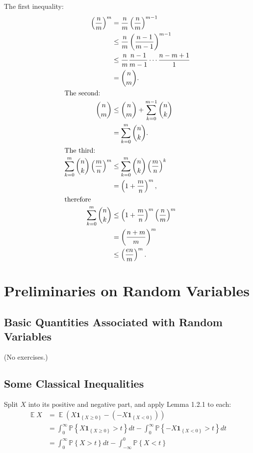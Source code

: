 \documentclass{report}
\theoremstyle{definition}
\newenvironment{exercise}[1]{
  \renewcommand\theexerciseimpl{#1}
  \exerciseimpl
}{\endexerciseimpl}
\DeclareMathOperator{\E}{\mathbb{E}}
\renewcommand{\P}[1]{\mathbb{P}\left\{#1\right\}}
\newcommand{\ind}[1]{\mathbf{1}_{\left\{#1\right\}}}
\begin{document}
\begin{exercise}{0.0.5}
  The first inequality:
  \begin{align*}
    \left(\frac{n}{m}\right)^m & = \frac{n}{m} \left(\frac{n}{m}\right)^{m-1} \\
    & \le \frac{n}{m} \left(\frac{n-1}{m-1}\right)^{m-1} \\
    & \le \frac{n}{m} \frac{n-1}{m-1} \cdots \frac{n-m+1}{1} \\
    & = \binom{n}{m}. \\
    \intertext{The second:}
    \binom{n}{m} & \le \binom{n}{m} + \sum_{k=0}^{m-1} \binom{n}{k} \\
    & = \sum_{k=0}^m \binom{n}{k}. \\
    \intertext{The third:}
    \sum_{k=0}^m \binom{n}{k} \left(\frac{m}{n}\right)^m & \le \sum_{k=0}^m \binom{n}{k} \left(\frac{m}{n}\right)^k \\
    & = \left(1 + \frac{m}{n}\right)^m, \\
    \intertext{therefore}
    \sum_{k=0}^m \binom{n}{k} & \le \left(1 + \frac{m}{n}\right)^m \left(\frac{n}{m}\right)^m \\
    & = \left(\frac{n + m}{m}\right)^m \\
    & \le \left(\frac{e n}{m}\right)^m.
  \end{align*}
\end{exercise}

\begin{exercise}{0.0.6}
\end{exercise}


\chapter{Preliminaries on Random Variables}

\section{Basic Quantities Associated with Random Variables}

(No exercises.)

\section{Some Classical Inequalities}

\begin{exercise}{1.2.2}
  Split $X$ into its positive and negative part, and apply Lemma 1.2.1 to each:
  \begin{align*}
    \E X & = \E (X \ind{X \ge 0} - (-X \ind{X < 0})) \\
    & = \int_0^\infty \P{X \ind{X \ge 0} > t} dt - \int_{0}^{\infty} \P{-X \ind{X < 0} > t} dt \\
    & = \int_0^\infty \P{X > t} dt - \int_{-\infty}^0 \P{X < t}
  \end{align*}
\end{exercise}
\end{document}
